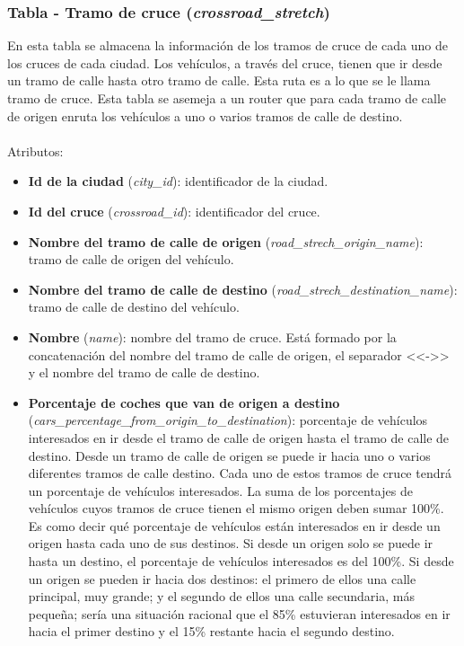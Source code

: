 \subsubsection{Tabla - Tramo de cruce (\textit{crossroad\_stretch})}
En esta tabla se almacena la información de los tramos de cruce de cada uno de los cruces de cada ciudad. Los vehículos, a través del cruce, tienen que ir desde un tramo de calle hasta otro tramo de calle. Esta ruta es a lo que se le llama tramo de cruce. Esta tabla se asemeja a un router que para cada tramo de calle de origen enruta los vehículos a uno o varios tramos de calle de destino. \\\\
Atributos:
\begin{itemize}
    \item \textbf{Id de la ciudad} (\textit{city\_id}): identificador de la ciudad.
    \item \textbf{Id del cruce} (\textit{crossroad\_id}): identificador del cruce.
    \item \textbf{Nombre del tramo de calle de origen} (\textit{road\_strech\_origin\_name}): tramo de calle de origen del vehículo.
    \item \textbf{Nombre del tramo de calle de destino} (\textit{road\_strech\_destination\_name}): tramo de calle de destino del vehículo.
    \item \textbf{Nombre} (\textit{name}): nombre del tramo de cruce. Está formado por la concatenación del nombre del tramo de calle de origen, el separador <<->> y el nombre del tramo de calle de destino.
    \item \textbf{Porcentaje de coches que van de origen a destino}\\ (\textit{cars\_percentage\_from\_origin\_to\_destination}): porcentaje de vehículos interesados en ir desde el tramo de calle de origen hasta el tramo de calle de destino. Desde un tramo de calle de origen se puede ir hacia uno o varios diferentes tramos de calle destino. Cada uno de estos tramos de cruce tendrá un porcentaje de vehículos interesados. La suma de los porcentajes de vehículos cuyos tramos de cruce tienen el mismo origen deben sumar 100\%. Es como decir qué porcentaje de vehículos están interesados en ir desde un origen hasta cada uno de sus destinos. Si desde un origen solo se puede ir hasta un destino, el porcentaje de vehículos interesados es del 100\%. Si desde un origen se pueden ir hacia dos destinos: el primero de ellos una calle principal, muy grande; y el segundo de ellos una calle secundaria, más pequeña; sería una situación racional que el 85\% estuvieran interesados en ir hacia el primer destino y el 15\% restante hacia el segundo destino. 
\end{itemize}
